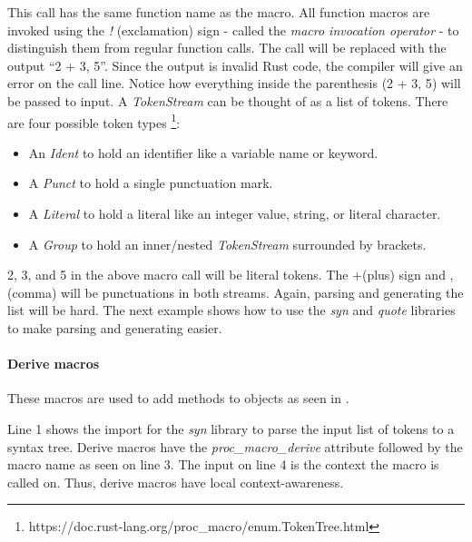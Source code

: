 This call has the same \colorbox{function}{function name} as the macro.
All function macros are invoked using the \textit{!} (exclamation) sign - called the \textit{macro invocation operator} - to distinguish them from regular function calls.
The call will be replaced with the \colorbox{output}{output} ``2 + 3, 5''.
Since the output is invalid Rust code, the compiler will give an error on the call line.
Notice how everything inside the parenthesis (\colorbox{input}{2 + 3, 5}) will be passed to \colorbox{input}{input}.
A \textit{TokenStream} can be thought of as a list of tokens.
There are four possible token types \footnote{https://doc.rust-lang.org/proc\_macro/enum.TokenTree.html}:

\begin{itemize}
	\item An \textit{Ident} to hold an identifier like a variable name or keyword.
	\item A \textit{Punct} to hold a single punctuation mark.
	\item A \textit{Literal} to hold a literal like an integer value, string, or literal character.
	\item A \textit{Group} to hold an inner/nested \textit{TokenStream} surrounded by brackets.
\end{itemize}

2, 3, and 5 in the above macro call will be literal tokens.
The +(plus) sign and ,(comma) will be punctuations in both streams.
Again, parsing and generating the list will be hard.
The next example shows how to use the \textit{syn} and \textit{quote} libraries to make parsing and generating easier.

\paragraph{Derive macros}
These macros are used to add methods to objects as seen in .


Line 1 shows the import for the \textit{syn} library to parse the input list of tokens to a syntax tree.
Derive macros have the \textit{proc\_macro\_derive} attribute followed by the macro \colorbox{function}{name} as seen on line 3.
The \colorbox{context}{input} on line 4 is the context the macro is called on.
Thus, derive macros have local context-awareness.

